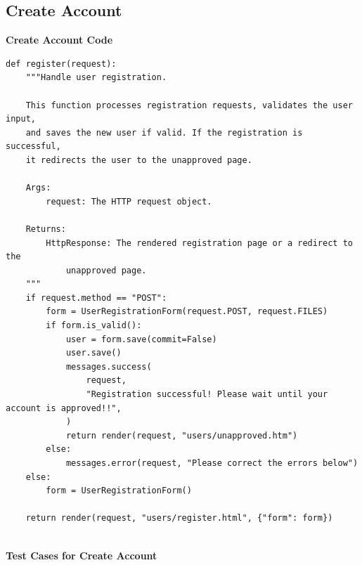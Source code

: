 \documentclass[a4paper,12pt]{article}
\begin{document}
\subsection{Create Account}
\textbf{Create Account Code}
\lstset{style=pythonSolarized}
\begin{lstlisting}
def register(request):
    """Handle user registration.

    This function processes registration requests, validates the user input,
    and saves the new user if valid. If the registration is successful,
    it redirects the user to the unapproved page.

    Args:
        request: The HTTP request object.

    Returns:
        HttpResponse: The rendered registration page or a redirect to the
            unapproved page.
    """
    if request.method == "POST":
        form = UserRegistrationForm(request.POST, request.FILES)
        if form.is_valid():
            user = form.save(commit=False)
            user.save()
            messages.success(
                request,
                "Registration successful! Please wait until your account is approved!!",
            )
            return render(request, "users/unapproved.htm")
        else:
            messages.error(request, "Please correct the errors below")
    else:
        form = UserRegistrationForm()

    return render(request, "users/register.html", {"form": form})


\end{lstlisting}
\textbf{Test Cases for Create Account}
\lstset{style=pythonSolarized}
\end{document}

